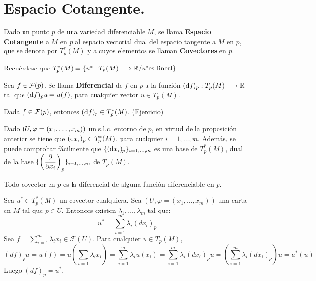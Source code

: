 \documentclass[Cursovd_portada.tex]{subfiles}
\begin{document}
\section{Espacio Cotangente.}
\begin{defi}
Dado un punto $p$ de una variedad diferenciable $M$, se llama {\bf Espacio Cotangente} a $M$ en $p$ al espacio
vectorial dual del espacio tangente a $M$ en $p$, que se denota por $T_p^*(M)$ y a cuyos elementos se llaman {\bf
Covectores} en $p$.
\end{defi}
Recuérdese que $T_p^*(M)=\{u^*:T_p(M)\longrightarrow\mathbb{R} /u^* {\rm es}\mbox{ }{\rm lineal}\}$.
\begin{defi}
Sea $f\in{\cal F}(p)$. Se llama {\bf Diferencial} de $f$ en $p$ a la función $({\rm d} f)_p:T_p(M)\longrightarrow\mathbb{R}$ tal que
$({\rm d} f)_pu=u(f)$, para cualquier vector $u\in T_p(M)$.
\end{defi}
\begin{prop}
Dada $f\in{\cal F}(p)$, entonces $({\rm d} f)_p\in T_p^*(M)$. (Ejercicio)
\end{prop}
Dado $(U,\varphi=(x_1,\dots ,x_m))$ un s.l.c. entorno de $p$, en virtud de la proposición anterior se tiene que
$({\rm d} x_i)_p\in T_p^*(M)$, para cualquier $i=1,\dots ,m$. Además, se puede comprobar fácilmente que
$\{({\rm d} x_i)_p\}_{i=1,\dots ,m}$ es una base de $T_p^*(M)$, dual de la base
$\{\left(\displaystyle{\frac{\partial}{\partial x_i}}\right)_p\}_{i=1,\dots ,m}$ de $T_p(M)$.
\begin{prop}
Todo covector en $p$ es la diferencial de alguna función diferenciable en $p$.
\end{prop}
\begin{dem}
Sea $u^* \in T_p^*(M)$ un covector cualquiera. Sea $(U,φ=(x_1,\dots,x_m))$ una carta en $M$ tal que $p \in U$. Entonces existen $λ_1,\dots,λ_m$ tal que:
\[ u^* = \sum_{i=1}^m λ_i(dx_i)_p \]
Sea $f = \sum_{i=1}^m λ_i x_i \in \mathcal{F}(U)$. Para cualquier $u \in T_p(M)$,
\[ (df)_pu = u(f) = u\left(\sum_{i=1} λ_i x_i\right) = \sum_{i=1}^m λ_i u(x_i)= \sum_{i=1}^m λ_i (dx_i)_p u = \left(\sum_{i=1}^m λ_i (dx_i)_p\right) u = u^*(u)\]
Luego $(df)_p = u^*$.
\end{dem}
\newpage
\end{document}
